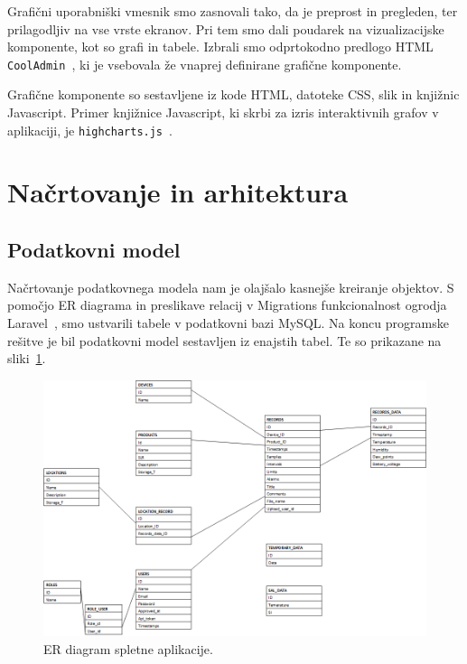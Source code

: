 \documentclass[a4paper, 12pt]{book}
\begin{document}
Grafični uporabniški vmesnik smo zasnovali tako, da je preprost in pregleden, ter prilagodljiv na vse vrste ekranov. Pri tem smo dali poudarek na vizualizacijske komponente, kot so grafi in tabele. Izbrali smo odprtokodno predlogo HTML {\tt CoolAdmin}~\cite{cooladmin-html-template}, ki je vsebovala že vnaprej definirane grafične komponente.

Grafične komponente so sestavljene iz kode HTML, datoteke CSS, slik in knjižnic Javascript.
Primer knjižnice Javascript, ki skrbi za izris interaktivnih grafov v aplikaciji, je {\tt highcharts.js}~\cite{hightchars-js}.




\section{Načrtovanje in arhitektura}

\subsection{Podatkovni model}

Načrtovanje podatkovnega modela nam je olajšalo kasnejše kreiranje objektov. S pomočjo ER diagrama in preslikave relacij v Migrations funkcionalnost ogrodja Laravel~\cite{laravel-migrations}, smo ustvarili tabele v podatkovni bazi MySQL. Na koncu programske rešitve je bil podatkovni model sestavljen iz enajstih tabel. Te so prikazane na sliki~\ref{database-model}.

\begin{figure}[t]
\begin{center}
\includegraphics[width=\textwidth]{slike/database_model-updated-for-diploma-1.png}
\end{center}
\caption{ER diagram spletne aplikacije.}
\label{database-model}
\end{figure}
\end{document}
